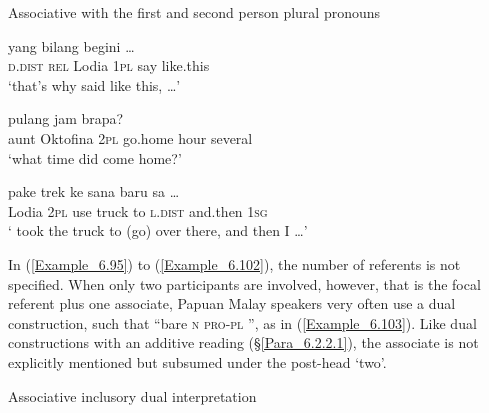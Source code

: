 \begin{styleExampleTitle}
Associative  with the first and second person plural pronouns
\end{styleExampleTitle}

\ea
\label{Example_6.100}
 {yang} {} {} {bilang} {begini} {\ldots}\\ %
 \textsc{d.dist}  \textsc{rel}  Lodia  \textsc{1pl}  say  like.this  \\

\glt
‘that’s why  said like this, {\ldots}’ \textstyleExampleSource{[081115-001a-Cv.0001]}
\z

\ea
\label{Example_6.101}
 {} {} {pulang} {jam} {brapa?}\\ %
 aunt  Oktofina  \textsc{2pl}  go.home  hour  several\\

\glt
‘what time did  come home?’ \textstyleExampleSource{[081006-010-Cv.0001]}
\z

\ea
\label{Example_6.102}
 {} {pake} {trek} {ke} {sana} {baru} {sa} {\ldots}\\ %
 Lodia  \textsc{2pl}  use  truck  to  \textsc{l.dist}  and.then  \textsc{1sg}  \\

\glt
‘ took the truck to (go) over there, and then I {\ldots}’ \textstyleExampleSource{[081022-001-Cv.0001]}
\z



In (\ref{Example_6.95}) to (\ref{Example_6.102}), the number of referents is not specified. When only two participants are involved, however, that is the focal referent plus one associate, Papuan Malay speakers very often use a dual construction, such that ``bare \textsc{n} \textsc{pro-pl} '', as in (\ref{Example_6.103}). Like dual constructions with an additive reading (§\ref{Para_6.2.2.1}), the associate is not explicitly mentioned but subsumed under the post-head   ‘two’.



\begin{styleExampleTitle}
Associative inclusory dual interpretation
\end{styleExampleTitle}

